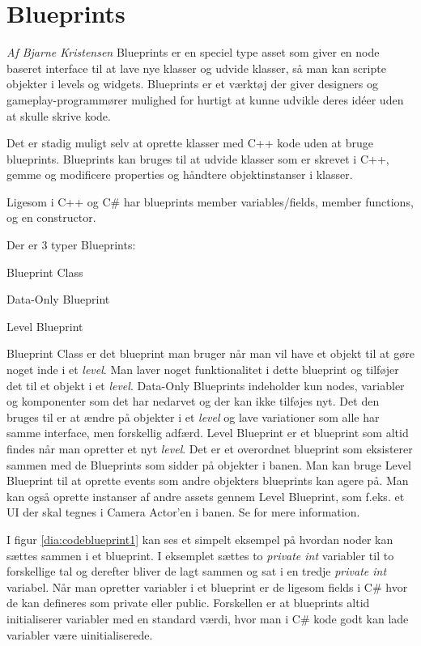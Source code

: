 \section{Blueprints}
\textit{Af Bjarne Kristensen}\newline
Blueprints er en speciel type asset som giver en node baseret interface til at lave nye klasser og udvide klasser, så man kan scripte objekter i levels og widgets. Blueprints er et værktøj der giver designers og gameplay-programmører mulighed for hurtigt at kunne udvikle deres idéer uden at skulle skrive kode.

Det er stadig muligt selv at oprette klasser med C++ kode uden at bruge blueprints. Blueprints kan bruges til at udvide klasser som er skrevet i C++, gemme og modificere properties og håndtere objektinstanser i klasser.

Ligesom i C++ og C\# har blueprints member variables/fields, member functions, og en constructor.

\begin{list}{}{}
\item[Der er 3 typer Blueprints:]
\item[Blueprint Class]
\item[Data-Only Blueprint]
\item[Level Blueprint]
\end{list}

Blueprint Class er det blueprint man bruger når man vil have et objekt til at gøre noget inde i et \textit{level}. Man laver noget funktionalitet i dette blueprint og tilføjer det til et objekt i et \textit{level}. Data-Only Blueprints indeholder kun nodes, variabler og komponenter som det har nedarvet og der kan ikke tilføjes nyt. Det den bruges til er at ændre på objekter i et \textit{level} og lave variationer som alle har samme interface, men forskellig adfærd. Level Blueprint er et blueprint som altid findes når man opretter et nyt \textit{level}. Det er et overordnet blueprint som eksisterer sammen med de Blueprints som sidder på objekter i banen. Man kan bruge Level Blueprint til at oprette events som andre objekters blueprints kan agere på. Man kan også oprette instanser af andre assets gennem Level Blueprint, som f.eks. et UI der skal tegnes i Camera Actor'en i banen. Se \cite{blueprint} for mere information.

I figur \ref{dia:codeblueprint1} kan ses et simpelt eksempel på hvordan noder kan sættes sammen i et blueprint. I eksemplet sættes to \textit{private int} variabler til to forskellige tal og derefter bliver de lagt sammen og sat i en tredje \textit{private int} variabel. Når man opretter variabler i et blueprint er de ligesom fields i C\# hvor de kan defineres som private eller public. Forskellen er at blueprints altid initialiserer variabler med en standard værdi, hvor man i C\# kode godt kan lade variabler være uinitialiserede.

